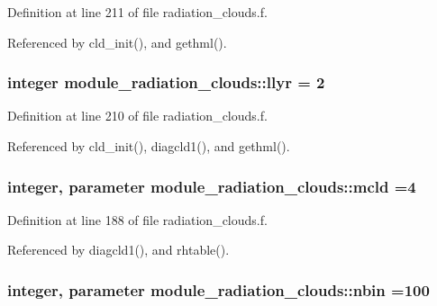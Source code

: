 Definition at line 211 of file radiation\+\_\+clouds.\+f.



Referenced by cld\+\_\+init(), and gethml().

\subsubsection[{\texorpdfstring{llyr}{llyr}}]{\setlength{\rightskip}{0pt plus 5cm}integer module\+\_\+radiation\+\_\+clouds\+::llyr = 2\hspace{0.3cm}{\ttfamily [private]}}\hypertarget{namespacemodule__radiation__clouds_a3390b20d42afccb3ec569a5b69a93f6e}{}\label{namespacemodule__radiation__clouds_a3390b20d42afccb3ec569a5b69a93f6e}


Definition at line 210 of file radiation\+\_\+clouds.\+f.



Referenced by cld\+\_\+init(), diagcld1(), and gethml().

\subsubsection[{\texorpdfstring{mcld}{mcld}}]{\setlength{\rightskip}{0pt plus 5cm}integer, parameter module\+\_\+radiation\+\_\+clouds\+::mcld =4\hspace{0.3cm}{\ttfamily [private]}}\hypertarget{namespacemodule__radiation__clouds_afb94f3d62afa49bef6c33f73a7ecad65}{}\label{namespacemodule__radiation__clouds_afb94f3d62afa49bef6c33f73a7ecad65}


Definition at line 188 of file radiation\+\_\+clouds.\+f.



Referenced by diagcld1(), and rhtable().

\subsubsection[{\texorpdfstring{nbin}{nbin}}]{\setlength{\rightskip}{0pt plus 5cm}integer, parameter module\+\_\+radiation\+\_\+clouds\+::nbin =100\hspace{0.3cm}{\ttfamily [private]}}\hypertarget{namespacemodule__radiation__clouds_ad2947b3c0a8382fbe12b76dd68b290e0}{}\label{namespacemodule__radiation__clouds_ad2947b3c0a8382fbe12b76dd68b290e0}


